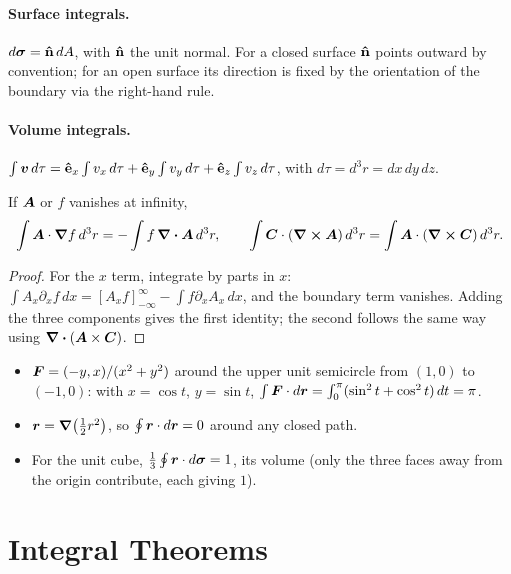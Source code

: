 \paragraph{Surface integrals.} $d\boldsymbol{\sigma} = \boldsymbol{\hat{\textbf{n}}}\,dA$, with $\boldsymbol{\hat{\textbf{n}}}$ the unit normal. For a closed surface $\boldsymbol{\hat{\textbf{n}}}$ points outward by convention; for an open surface its direction is fixed by the orientation of the boundary via the right-hand rule.

\paragraph{Volume integrals.} $\int\bm{v}\,d\tau = \boldsymbol{\hat{\textbf{e}}}_x\int v_x\,d\tau + \boldsymbol{\hat{\textbf{e}}}_y\int v_y\,d\tau + \boldsymbol{\hat{\textbf{e}}}_z\int v_z\,d\tau$, with $d\tau = d^3r = dx\,dy\,dz$.

\begin{theorem}
If $\vect{A}$ or $f$ vanishes at infinity,
\[
    \int\vect{A}\cdot\grad f\,d^3r = -\int f\,\div\vect{A}\,d^3r,
    \qquad
    \int\vect{C}\cdot(\curl\vect{A})\,d^3r = \int\vect{A}\cdot(\curl\vect{C})\,d^3r.
\]
\end{theorem}
\begin{proof}
For the $x$ term, integrate by parts in $x$: $\int A_x\partial_xf\,dx = [A_xf]_{-\infty}^{\infty} - \int f\partial_xA_x\,dx$, and the boundary term vanishes. Adding the three components gives the first identity; the second follows the same way using $\div(\vect{A}\times\vect{C})$.
\end{proof}

\begin{example}
\begin{itemize}
    \item $\vect{F} = (-y,x)/(x^2+y^2)$ around the upper unit semicircle from $(1,0)$ to $(-1,0)$: with $x=\cos t$, $y=\sin t$, $\int\vect{F}\cdot d\lvect{r} = \int_0^\pi(\sin^2t+\cos^2t)\,dt = \pi$.
    \item $\bm{r} = \grad\bigl(\tfrac12r^2\bigr)$, so $\oint\bm{r}\cdot d\bm{r} = 0$ around any closed path.
    \item For the unit cube, $\tfrac13\oint\bm{r}\cdot d\boldsymbol{\sigma} = 1$, its volume (only the three faces away from the origin contribute, each giving $1$).
\end{itemize}
\end{example}

\section{Integral Theorems}

